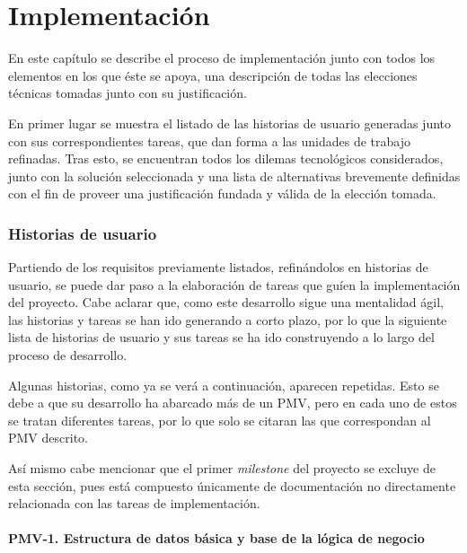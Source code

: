 \chapter{Implementación}

En este capítulo se describe el proceso de implementación junto con todos los elementos en los que éste se apoya, una descripción de todas las elecciones técnicas tomadas junto con su justificación.

En primer lugar se muestra el listado de las historias de usuario generadas junto con sus correspondientes tareas, que dan forma a las unidades de trabajo refinadas. Tras esto, se encuentran todos los dilemas tecnológicos considerados, junto con la solución seleccionada y  una lista de alternativas brevemente definidas con el fin de proveer una justificación fundada y válida de la elección tomada.

\subsection{Historias de usuario}

Partiendo de los requisitos previamente listados, refinándolos en historias de usuario, se puede dar paso a la elaboración de tareas que guíen la implementación del proyecto. Cabe aclarar que, como este desarrollo sigue una mentalidad ágil, las historias y tareas se han ido generando a corto plazo, por lo que la siguiente lista de historias de usuario y sus tareas se ha ido construyendo a lo largo del proceso de desarrollo.

Algunas historias, como ya se verá a continuación, aparecen repetidas. Esto se debe a que su desarrollo ha abarcado más de un PMV, pero en cada uno de estos se tratan diferentes tareas, por lo que solo se citaran las que correspondan al PMV descrito.

Así mismo cabe mencionar que el primer \textit{milestone} del proyecto se excluye de esta sección, pues está compuesto únicamente de documentación no directamente relacionada con las tareas de implementación.

\subsubsection{PMV-1. Estructura de datos básica y base de la lógica de negocio}

